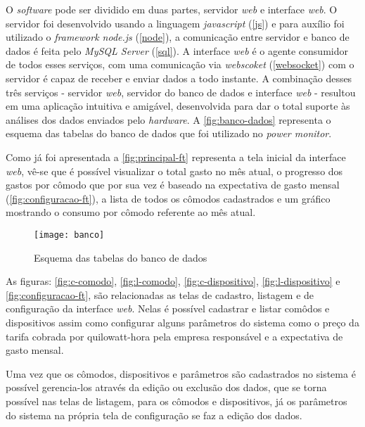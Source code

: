 O \textit{software} pode ser dividido em duas partes, servidor \textit{web} e interface \textit{web}. O servidor foi desenvolvido usando a linguagem
\textit{javascript} (\autoref{js}) e para auxílio foi utilizado o \textit{framework node.js} (\autoref{node}), a comunicação entre servidor e banco de dados
é feita pelo \textit{MySQL Server} (\autoref{sql}). A interface \textit{web} é o agente consumidor de todos esses serviços, com uma comunicação via 
\textit{webscoket} (\autoref{websocket}) com o servidor é capaz de receber e enviar dados a todo instante. A combinação desses três serviços - servidor \textit{web},
servidor do banco de dados e interface \textit{web} - resultou em uma aplicação intuitiva e amigável, desenvolvida para dar o total suporte às análises dos dados
enviados pelo \textit{hardware}. A \autoref{fig:banco-dados} representa o esquema das tabelas do banco de dados que foi utilizado no \textit{power monitor}.

Como já foi apresentada a \autoref{fig:principal-ft} representa a tela inicial da interface \textit{web}, vê-se que é possível
visualizar o total gasto no mês atual, o progresso dos gastos por cômodo que por sua vez é baseado na expectativa de gasto mensal (\autoref{fig:configuracao-ft}), a lista
de todos os cômodos cadastrados e um gráfico mostrando o consumo por cômodo referente ao mês atual.

\begin{figure}[h!]
	\texttt{[image: banco]}
	\centering
	\caption[Esquema das tabelas do banco de dados]{Esquema das tabelas do banco de dados}
	\label{fig:banco-dados}
\end{figure}
\FloatBarrier

As figuras: \ref{fig:c-comodo}, \ref{fig:l-comodo}, \ref{fig:c-dispositivo}, \ref{fig:l-dispositivo} e \ref{fig:configuracao-ft}, 
são relacionadas as telas de cadastro, listagem e de configuração da interface \textit{web}. Nelas é possível cadastrar e listar comôdos e dispositivos assim como 
configurar alguns parâmetros do sistema como o preço da tarifa cobrada por quilowatt-hora pela empresa responsável e a expectativa de gasto mensal.

Uma vez que os cômodos, dispositivos e parâmetros são cadastrados no sistema é possível gerencia-los através da edição ou exclusão dos dados, que se torna possível
nas telas de listagem, para os cômodos e dispositivos, já os parâmetros do sistema na própria tela de configuração se faz a edição dos dados. 

